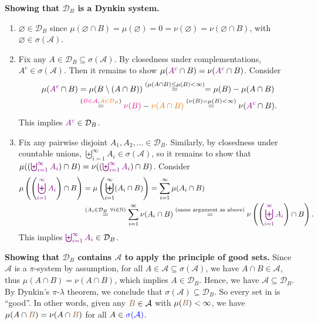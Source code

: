 \begin{enumerate}
\begin{pf}
\textbf{Showing that \(\mathcal{D}_{B}\) is a Dynkin system.}
\begin{enumerate}[label={(\arabic*)}]
\item \(\varnothing\in\mathcal{D}_{B}\) since \(\mu(\varnothing\cap
B)=\mu(\varnothing)=0=\nu(\varnothing)=\nu(\varnothing\cap B)\), with
\(\varnothing\in\sigma(\mathcal{A})\).
\item Fix any \(A\in\mathcal{D}_{B}\subseteq \sigma(\mathcal{A})\). By
closedness under complementations, \(A^c\in\sigma(\mathcal{A})\). Then it
remains to show \(\mu(\vc{A^c}\cap B)=\nu(\vc{A^c}\cap B)\). Consider
\begin{align*}
\mu(\vc{A^c}\cap B)
&=\mu(B\setminus (A\cap B))
\overset{(\mu(A\cap B)\le\mu(B)<\infty)}{=}
=\mu(B)-\mu(A\cap B) \\
&\overset{(\mgc{B\in\mathcal{A}}, \orc{A\in\mathcal{D}_{B}})}{=}
\mgc{\nu(B)}-\orc{\nu(A\cap B)}
\overset{(\nu(B)=\mu(B)<\infty)}{=}\nu(\vc{A^c}\cap B).
\end{align*}
This implies \(\vc{A^c}\in\mathcal{D}_{B}\).
\item Fix any pairwise disjoint \(A_1,A_2,\dotsc\in\mathcal{D}_{B}\).
Similarly, by closedness under countable unions, \(\biguplus_{i=1}^{\infty}A_i\in\sigma(\mathcal{A})\),
so it remains to show that \(\mu((\vc{\biguplus_{i=1}^{\infty}A_i})\cap
B)=\nu((\vc{\biguplus_{i=1}^{\infty}A_i})\cap B)\). Consider
\begin{align*}
\mu\left(\left(\vc{\biguplus_{i=1}^{\infty}A_i}\right)\cap B\right)
&=\mu\left(\biguplus_{i=1}^{\infty}(A_i\cap B)\right)
=\sum_{i=1}^{\infty}\mu(A_i\cap B) \\
&\overset{(A_i\in\mathcal{D}_{B}~\forall i\in\N)}{=}
\sum_{i=1}^{\infty}\nu(A_i\cap B)
\overset{\text{(same argument as above)}}{=}\nu\left(\left(\vc{\biguplus_{i=1}^{\infty}A_i}\right)\cap B\right).
\end{align*}
This implies \(\vc{\biguplus_{i=1}^{\infty}A_i}\in\mathcal{D}_{B}\).
\end{enumerate}

\textbf{Showing that \(\mathcal{D}_{B}\) contains \(\mathcal{A}\) to apply the
principle of good sets.} Since \(\mathcal{A}\) is a \(\pi\)-system by
assumption, for all \(A\in\mathcal{A}\subseteq\sigma(\mathcal{A})\), we have
\(A\cap B\in\mathcal{A}\), thus \(\mu(A\cap B) =\nu(A\cap B)\), which implies
\(A\in\mathcal{D}_{B}\). Hence, we have \(\mathcal{A}\subseteq
\mathcal{D}_{B}\). By Dynkin's \(\pi\)-\(\lambda\) theorem, we conclude that
\(\sigma(\mathcal{A})\subseteq \mathcal{D}_{B}\). So every set in
 is ``good''. In other words, given any
\(\brc{B}\in\mathcal{A}\) with \(\mu(\brc{B})<\infty\), we have \(\mu(A\cap \brc{B})=\nu(A\cap
\brc{B})\) for all \(A\in\blc{\sigma(\mathcal{A})}\).


\end{pf}
\end{enumerate}
